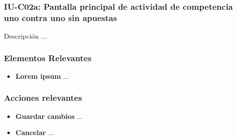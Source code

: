
\subsubsection{IU-C02a: Pantalla principal de actividad de competencia uno contra uno sin apuestas}

 Descripción ...


\subsubsection{Elementos Relevantes}

    \begin{itemize}
    \item {\bf Lorem ipsum}
        ...
    \end{itemize}

\subsubsection{Acciones relevantes}

    \begin{itemize}
    \item {\bf Guardar cambios}
        ...

    \item {\bf Cancelar}
        ...
    \end{itemize}

\clearpage
